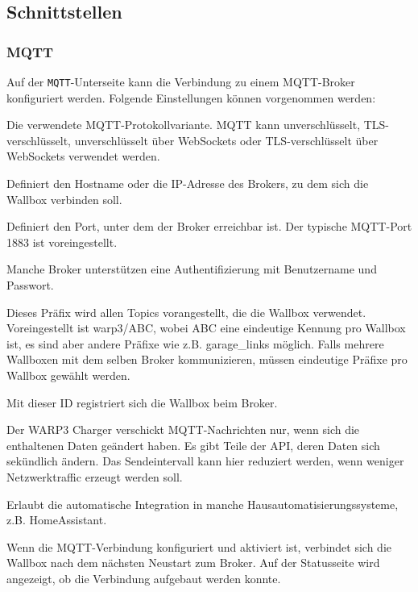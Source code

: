 \documentclass[a4paper,10pt]{article}
\begin{document}
\begin{multicols*}{2}
	\subsection{Schnittstellen}
	\subsubsection{MQTT}
	\label{mqtt-interface}
    
    Auf der \texttt{MQTT}-Unterseite kann die Verbindung zu einem MQTT-Broker konfiguriert werden. Folgende Einstellungen können vorgenommen werden:
    \begin{description}[labelindent=0.5cm, leftmargin=0.5cm]
        \item[Protokoll] Die verwendete MQTT-Protokollvariante. MQTT kann unverschlüsselt, TLS-verschlüsselt, unverschlüsselt über WebSockets oder TLS-verschlüsselt über WebSockets verwendet werden.
        \item[Broker-Hostname oder -IP-Adresse] Definiert den Hostname oder die IP-Adresse des Brokers, zu dem sich die Wallbox verbinden soll.
        \item[Broker-Port] Definiert den Port, unter dem der Broker erreichbar ist. Der typische MQTT-Port 1883 ist voreingestellt.
        \item[Broker-Benutzername und -Passwort] Manche Broker unterstützen eine Authentifizierung mit Benutzername und Passwort.
        \item[Topic-Präfix] Dieses Präfix wird allen Topics vorangestellt, die die Wallbox verwendet.
              Voreingestellt ist warp3/ABC, wobei ABC eine eindeutige Kennung pro Wallbox ist,
              es sind aber andere Präfixe wie z.B. garage\_links möglich.
              Falls mehrere Wallboxen mit dem selben Broker kommunizieren,
              müssen eindeutige Präfixe pro Wallbox gewählt werden.
        \item[Client-ID] Mit dieser ID registriert sich die Wallbox beim Broker.
        \item[Sendeintervall] Der WARP3 Charger verschickt MQTT-Nachrichten nur, wenn sich die enthaltenen Daten geändert haben.
            Es gibt Teile der API, deren Daten sich sekündlich ändern. Das Sendeintervall kann hier reduziert werden, wenn weniger Netzwerktraffic
            erzeugt werden soll.
        \item[Discovery] Erlaubt die automatische Integration in manche Hausautomatisierungssysteme, z.B. HomeAssistant.
    \end{description}
    Wenn die MQTT-Verbindung konfiguriert und aktiviert ist, verbindet sich die Wallbox nach dem nächsten Neustart zum Broker. Auf der Statusseite wird angezeigt, ob die Verbindung aufgebaut werden konnte.


\end{multicols*}
\end{document}
